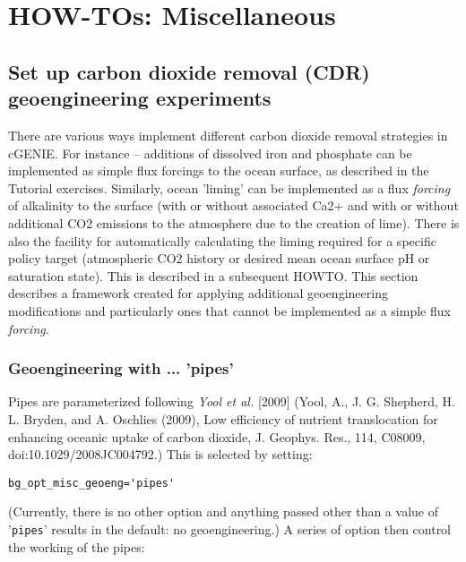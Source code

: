 \documentclass[10pt,twoside]{article}
\begin{document}
\newpage
\section{HOW-TOs: Miscellaneous}\label{how-to-9}

\subsection{Set up carbon dioxide removal (CDR) geoengineering experiments}

There are various ways implement different carbon dioxide removal strategies in cGENIE. For instance -- additions of dissolved iron and phosphate can be implemented as simple flux forcings to the ocean surface, as described in the Tutorial exercises. Similarly, ocean 'liming'
 can be implemented as a flux \textit{forcing} of alkalinity to the surface (with or without associated Ca2+ and with or without additional CO2 emissions to the atmosphere due to the creation of lime).
There is also the facility for automatically calculating the liming required for a specific policy target (atmospheric CO2 history or desired mean ocean surface pH or saturation state). This is described in a subsequent HOWTO.
This section describes a framework created for applying additional geoengineering modifications and particularly ones that cannot be implemented as a simple flux \textit{forcing}.


\subsubsection{Geoengineering with ... 'pipes'}

Pipes are parameterized following \textit{Yool et al.} [2009] (Yool, A., J. G. Shepherd, H. L. Bryden, and A. Oschlies (2009), Low efficiency of nutrient translocation for enhancing
oceanic uptake of carbon dioxide, J. Geophys. Res., 114, C08009, doi:10.1029/2008JC004792.) This is selected by setting:
\vspace{-10pt}\begin{verbatim}
bg_opt_misc_geoeng='pipes'
\end{verbatim}\vspace{-10pt}
(Currently, there is no other option and anything passed other than a value of '\texttt{pipes}' results in the default: no geoengineering.)
A series of option then control the working of the pipes:
\end{document}
